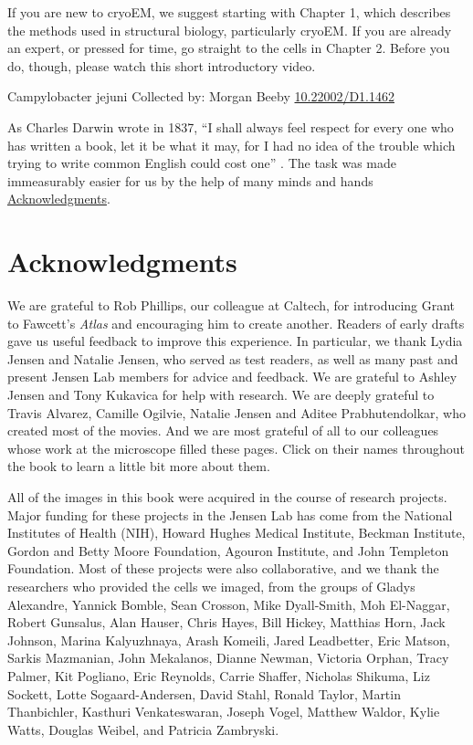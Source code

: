 \documentclass[]{tufte-book}
\begin{document}
If you are new to cryoEM, we suggest starting with Chapter 1, which describes the methods used in structural biology, particularly cryoEM. If you are already an expert, or pressed for time, go straight to the cells in Chapter 2. Before you do, though, please watch this short introductory video.

\hypertarget{htmlwidget-499e3fae54f5da9947ac}{}

\label{fig:unnamed-chunk-1}Campylobacter jejuni Collected by: Morgan Beeby \href{https://doi.org/10.22002/D1.1462}{10.22002/D1.1462}

As Charles Darwin wrote in 1837, ``I shall always feel respect for every one who has written a book, let it be what it may, for I had no idea of the trouble which trying to write common English could cost one'' \citep{darwin1888}. The task was made immeasurably easier for us by the help of many minds and hands \protect\hyperlink{acknowledgments}{Acknowledgments}.

\hypertarget{acknowledgments}{%
\section*{Acknowledgments}\label{acknowledgments}}

We are grateful to Rob Phillips, our colleague at Caltech, for introducing Grant to Fawcett's \emph{Atlas} and encouraging him to create another. Readers of early drafts gave us useful feedback to improve this experience. In particular, we thank Lydia Jensen and Natalie Jensen, who served as test readers, as well as many past and present Jensen Lab members for advice and feedback. We are grateful to Ashley Jensen and Tony Kukavica for help with research. We are deeply grateful to Travis Alvarez, Camille Ogilvie, Natalie Jensen and Aditee Prabhutendolkar, who created most of the movies. And we are most grateful of all to our colleagues whose work at the microscope filled these pages. Click on their names throughout the book to learn a little bit more about them.

All of the images in this book were acquired in the course of research projects. Major funding for these projects in the Jensen Lab has come from the National Institutes of Health (NIH), Howard Hughes Medical Institute, Beckman Institute, Gordon and Betty Moore Foundation, Agouron Institute, and John Templeton Foundation. Most of these projects were also collaborative, and we thank the researchers who provided the cells we imaged, from the groups of Gladys Alexandre, Yannick Bomble, Sean Crosson, Mike Dyall-Smith, Moh El-Naggar, Robert Gunsalus, Alan Hauser, Chris Hayes, Bill Hickey, Matthias Horn, Jack Johnson, Marina Kalyuzhnaya, Arash Komeili, Jared Leadbetter, Eric Matson, Sarkis Mazmanian, John Mekalanos, Dianne Newman, Victoria Orphan, Tracy Palmer, Kit Pogliano, Eric Reynolds, Carrie Shaffer, Nicholas Shikuma, Liz Sockett, Lotte Sogaard-Andersen, David Stahl, Ronald Taylor, Martin Thanbichler, Kasthuri Venkateswaran, Joseph Vogel, Matthew Waldor, Kylie Watts, Douglas Weibel, and Patricia Zambryski.
\end{document}
